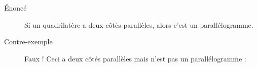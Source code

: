 \begin{example}
    \begin{description}
        \item[Énoncé] Si un quadrilatère a deux côtés parallèles, alors c'est un parallélogramme.
        \item[Contre-exemple] Faux ! Ceci a deux côtés parallèles mais n'est pas un parallélogramme :
            \begin{center}
               
            \end{center}
    \end{description}
\end{example}


